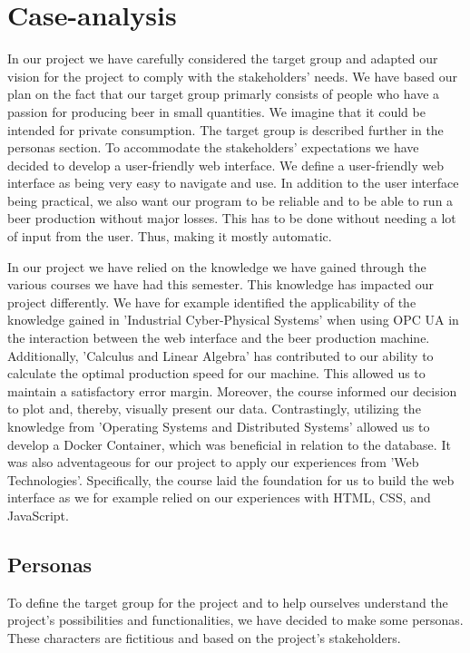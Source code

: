 
\section{Case-analysis}
In our project we have carefully considered the target group and adapted our vision for the project to comply with the stakeholders' needs.
We have based our plan on the fact that our target group primarly consists of people who have a passion for 
producing beer in small quantities. We imagine that it could be intended for private consumption. The target group is described further in the personas section.
To accommodate the stakeholders' expectations we have decided to develop a user-friendly web interface. We define a user-friendly web interface as being very easy to navigate and use.
In addition to the user interface being practical, we also want our program to be reliable and to be able to run a 
beer production without major losses. This has to be done without needing a lot of input from the user. Thus, making it mostly automatic.

In our project we have relied on the knowledge we have gained through the various courses we have had this semester.
This knowledge has impacted our project differently. We have for example identified the applicability of the knowledge gained in 'Industrial Cyber-Physical Systems' when using OPC UA in the 
interaction between the web interface and the beer production machine. Additionally, 'Calculus and Linear Algebra' has contributed to our ability to calculate the optimal production speed for our machine.
This allowed us to maintain a satisfactory error margin. Moreover, the course informed our decision to plot and, thereby, visually present our data.
Contrastingly, utilizing the knowledge from 'Operating Systems and Distributed Systems' allowed us to develop a Docker Container, which was beneficial in relation to the database.
It was also adventageous for our project to apply our experiences from 'Web Technologies'. Specifically, the course laid the foundation for us to build the web interface as we for example relied on 
our experiences with HTML, CSS, and JavaScript.



\subsection{Personas}
To define the target group for the project and to help ourselves understand the project's possibilities and functionalities, 
we have decided to make some personas. These characters are fictitious and based on the project's stakeholders. \newline

